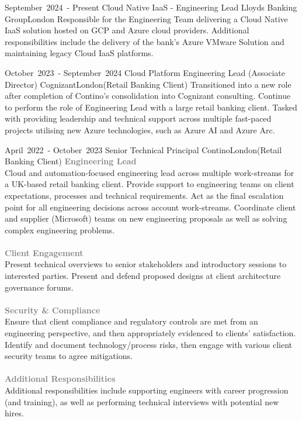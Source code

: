 
\edef\hc{\string:}
\cventry %
  {\mbox{September 2024 -} \mbox{Present}}
  {Cloud Native IaaS - Engineering Lead}
  {Lloyds Banking Group}{London}{}
  {
    Responsible for the Engineering Team delivering a Cloud Native IaaS solution 
    hosted on GCP and Azure cloud providers. Additional responsibilities include 
    the delivery of the bank's Azure VMware Solution and maintaining legacy
    Cloud IaaS platforms.
  }


\cventry %
  {\mbox{October 2023 -} \mbox{September 2024}}
  {Cloud Platform Engineering Lead (Associate Director)}
  {Cognizant}{London}{(Retail Banking Client)}
  {
    Transitioned into a new role after completion of Contino's consolidation into 
    Cognizant consulting. Continue to perform the role of Engineering Lead with 
    a large retail banking client. Tasked with providing leadership and technical 
    support across multiple fast-paced projects utilising new Azure technologies, 
    such as Azure AI and Azure Arc.
  }

\cventry %
  {\mbox{April 2022 -} \mbox{October 2023}}
  {Senior Technical Principal}
  {Contino}{London}{(Retail Banking Client)}
  {
    \textcolor{gray}{\textbf{Engineering Lead}}\\ 
    Cloud and automation-focused engineering lead across multiple work-streams 
    for a UK-based retail banking client. Provide support to engineering teams
    on client expectations, processes and technical requirements.
    Act as the final escalation point for all engineering decisions across 
    account work-streams. Coordinate client and supplier (Microsoft) teams on
    new engineering proposals as well as solving complex engineering problems.\\\\
    \textcolor{gray}{\textbf{Client Engagement}}\\ 
    Present technical overviews to senior stakeholders and introductory sessions
    to interested parties. Present and defend proposed designs at client 
    architecture governance forums.\\\\
    \textcolor{gray}{\textbf{Security \& Compliance}}\\ 
    Ensure that client compliance and regulatory controls are met from an engineering 
    perspective, and then appropriately evidenced to clients' satisfaction.
    Identify and document technology/process risks, then engage with various client
    security teams to agree mitigations.\\\\
    \textcolor{gray}{\textbf{Additional Responsibilities}}\\ 
    Additional responsibilities include supporting engineers with career
    progression (and training), as well as performing technical interviews with
    potential new hires.\\
  }

